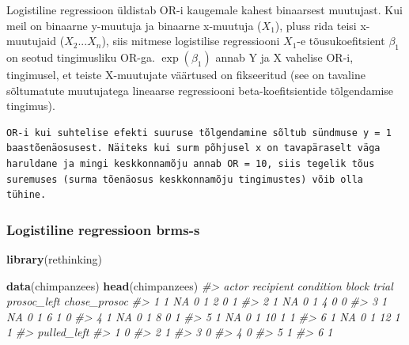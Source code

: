 \documentclass[]{book}
\newenvironment{Shaded}{\begin{snugshade}}{\end{snugshade}}
\newcommand{\KeywordTok}[1]{\textcolor[rgb]{0.13,0.29,0.53}{\textbf{#1}}}
\newcommand{\CommentTok}[1]{\textcolor[rgb]{0.56,0.35,0.01}{\textit{#1}}}
\newcommand{\NormalTok}[1]{#1}
\begin{document}
Logistiline regressioon üldistab OR-i kaugemale kahest binaarsest
muutujast. Kui meil on binaarne y-muutuja ja binaarne x-muutuja
(\(X_1\)), pluss rida teisi x-muutujaid (\(X_2...X_n\)), siis mitmese
logistilise regressiooni \(X_1\)-e tõusukoefitsient \(\beta_1\) on
seotud tingimusliku OR-ga. \(\exp(\beta_1)\) annab Y ja X vahelise OR-i,
tingimusel, et teiste X-muutujate väärtused on fikseeritud (see on
tavaline sõltumatute muutujatega lineaarse regressiooni
beta-koefitsientide tõlgendamise tingimus).

\begin{verbatim}
OR-i kui suhtelise efekti suuruse tõlgendamine sõltub sündmuse y = 1 
baastõenäosusest. Näiteks kui surm põhjusel x on tavapäraselt väga 
haruldane ja mingi keskkonnamõju annab OR = 10, siis tegelik tõus 
suremuses (surma tõenäosus keskkonnamõju tingimustes) võib olla tühine. 
\end{verbatim}

\subsubsection{Logistiline regressioon
brms-s}\label{logistiline-regressioon-brms-s}

\begin{Shaded}
\begin{Highlighting}[]
\KeywordTok{library}\NormalTok{(rethinking)}
\end{Highlighting}
\end{Shaded}

\begin{Shaded}
\begin{Highlighting}[]
\KeywordTok{data}\NormalTok{(chimpanzees)}
\KeywordTok{head}\NormalTok{(chimpanzees)}
\CommentTok{#>   actor recipient condition block trial prosoc_left chose_prosoc}
\CommentTok{#> 1     1        NA         0     1     2           0            1}
\CommentTok{#> 2     1        NA         0     1     4           0            0}
\CommentTok{#> 3     1        NA         0     1     6           1            0}
\CommentTok{#> 4     1        NA         0     1     8           0            1}
\CommentTok{#> 5     1        NA         0     1    10           1            1}
\CommentTok{#> 6     1        NA         0     1    12           1            1}
\CommentTok{#>   pulled_left}
\CommentTok{#> 1           0}
\CommentTok{#> 2           1}
\CommentTok{#> 3           0}
\CommentTok{#> 4           0}
\CommentTok{#> 5           1}
\CommentTok{#> 6           1}
\end{Highlighting}
\end{Shaded}
\end{document}
